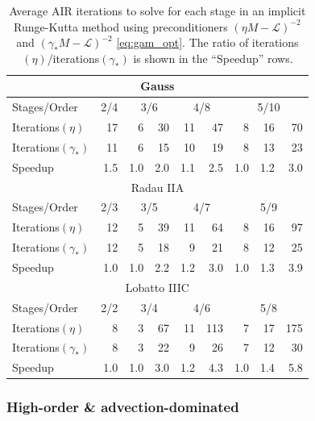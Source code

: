 \documentclass[review]{siamart}
\begin{document}
{
\renewcommand{\arraystretch}{1.15}
\begin{table}[!ht]
  \centering
  \begin{tabular}{|l || r | rr | rr | rrr |}  %
  \hline
\multicolumn{9}{|c|}{Gauss}\\\hline
Stages/Order & 2/4 & \multicolumn{2}{c}{3/6} & \multicolumn{2}{|c}{4/8} & \multicolumn{3}{|c|}{5/10} \\\hline
Iterations$(\eta)$ & 17 & 6 & 30 & 11  & 47 & 8 & 16 & 70 \\
Iterations$(\gamma_*)$ & 11 & 6 & 15 & 10 & 19 & 8 & 13 & 23 \\\hline
Speedup & 1.5 & 1.0 & 2.0 & 1.1 & 2.5 & 1.0 & 1.2 & 3.0 \\\hline\hline
\multicolumn{9}{|c|}{Radau IIA}\\\hline
Stages/Order & 2/3 & \multicolumn{2}{c}{3/5} & \multicolumn{2}{|c}{4/7} & \multicolumn{3}{|c|}{5/9} \\\hline
Iterations$(\eta)$ & 12 & 5 & 39 & 11 & 64 & 8 & 16 & 97 \\
Iterations$(\gamma_*)$ & 12 & 5 & 18 & 9 & 21 & 8 & 12 & 25 \\\hline
Speedup & 1.0 & 1.0 & 2.2 & 1.2 & 3.0 & 1.0 & 1.3 & 3.9 \\\hline\hline
\multicolumn{9}{|c|}{Lobatto IIIC}\\\hline
Stages/Order & 2/2 & \multicolumn{2}{c}{3/4} & \multicolumn{2}{|c}{4/6} & \multicolumn{3}{|c|}{5/8} \\\hline
Iterations$(\eta)$ & 8 & 3 & 67 & 11 & 113 & 7 & 17 & 175 \\
Iterations$(\gamma_*)$ & 8 & 3 & 22 & 9 & 26 & 7 & 12 & 30 \\\hline
Speedup & 1.0 & 1.0 & 3.0 & 1.2 & 4.3 & 1.0 & 1.4 & 5.8 \\\hline\hline
  \end{tabular}
  \caption{Average AIR iterations to solve for each stage in an implicit
  Runge-Kutta method using preconditioners $(\eta M - \mathcal{L})^{-2}$ and
  $(\gamma_* M - \mathcal{L})^{-2}$ \eqref{eq:gam_opt}. The ratio of
  iterations$(\eta)$/iterations$(\gamma_*)$ is shown in the ``Speedup'' rows.}
  \label{tab:gamma}
\end{table}
}


\subsubsection{High-order \& advection-dominated}\label{sec:numerics:dg:adv}
\end{document}
